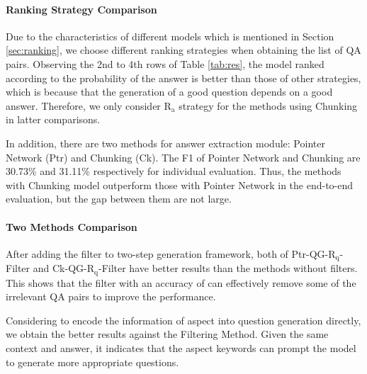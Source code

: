 \paragraph{Ranking Strategy Comparison}
Due to the characteristics of different models which is mentioned in Section \ref{sec:ranking}, 
we choose different ranking strategies when obtaining the list of QA pairs.
Observing the 2nd to 4th rows of Table \ref{tab:res}, 
the model ranked according to the probability of the answer is better than those of other strategies,
which is because that the generation of a good question depends on a good answer.
Therefore, we only consider $\text{R}_\text{a}$ strategy for the methods using Chunking in latter comparisons.

In addition, there are two methods for answer extraction module: Pointer Network (Ptr) and Chunking (Ck).
The F1 of Pointer Network and Chunking are 30.73\% and 31.11\% respectively for individual evaluation.
Thus, the methods with Chunking model outperform those with Pointer Network in the end-to-end evaluation, but the gap between them are not large.

\paragraph{Two Methods Comparison}
After adding the filter to two-step generation framework, 
both of Ptr-QG-$\text{R}_\text{q}$-Filter and Ck-QG-$\text{R}_\text{q}$-Filter have better results than the methods without filters.
This shows that the filter with an accuracy of  can effectively remove some of the irrelevant QA pairs to improve the performance.

Considering to encode the information of aspect into question generation directly, we obtain the better results against the Filtering Method.
Given the same context and answer, it indicates that the aspect keywords can prompt the model to generate more appropriate questions.

